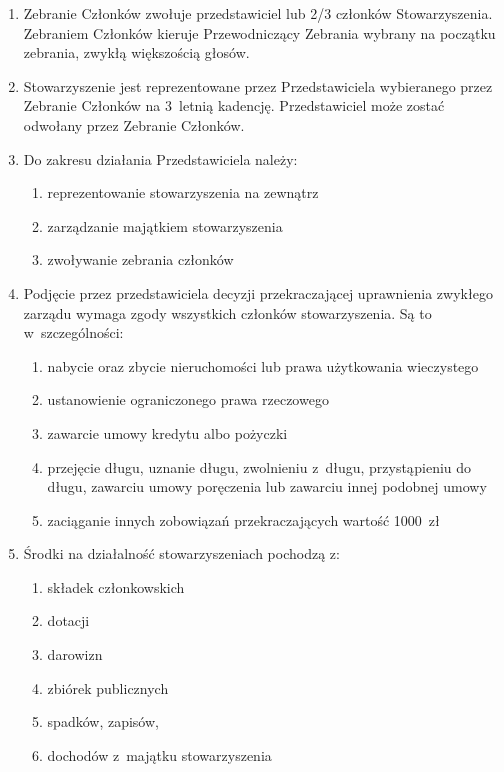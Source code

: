 \documentclass[11pt,a4paper]{article}
\begin{document}
\begin{enumerate}
  \item Zebranie Członków zwołuje przedstawiciel lub 2/3 członków Stowarzyszenia. Zebraniem Członków kieruje Przewodniczący Zebrania wybrany na początku zebrania, zwykłą większością głosów.

  \item Stowarzyszenie jest reprezentowane przez Przedstawiciela wybieranego przez Zebranie Członków na 3~letnią kadencję. Przedstawiciel może zostać odwołany przez Zebranie Członków.

  \item Do zakresu działania Przedstawiciela należy:
  \begin{enumerate}
    \item reprezentowanie stowarzyszenia na zewnątrz
    \item zarządzanie majątkiem stowarzyszenia
    \item zwoływanie zebrania członków
  \end{enumerate}

  \item Podjęcie przez przedstawiciela decyzji przekraczającej uprawnienia zwykłego zarządu wymaga zgody wszystkich członków stowarzyszenia. Są to w~szczególności:
  \begin{enumerate}
    \item nabycie oraz zbycie nieruchomości lub prawa użytkowania wieczystego
    \item ustanowienie ograniczonego prawa rzeczowego
    \item zawarcie umowy kredytu albo pożyczki
    \item przejęcie długu, uznanie długu, zwolnieniu z~długu, przystąpieniu do długu, zawarciu umowy poręczenia lub zawarciu innej podobnej umowy
    \item zaciąganie innych zobowiązań przekraczających wartość 1000~zł
  \end{enumerate}

  \setcounter{enumi}{24}
  \item Środki na działalność stowarzyszeniach pochodzą z:
  \begin{enumerate}
    \item składek członkowskich
    \item dotacji
    \item darowizn
    \item zbiórek publicznych
    \item spadków, zapisów,
    \item dochodów z~majątku stowarzyszenia
  \end{enumerate}


\end{enumerate}
\end{document}
